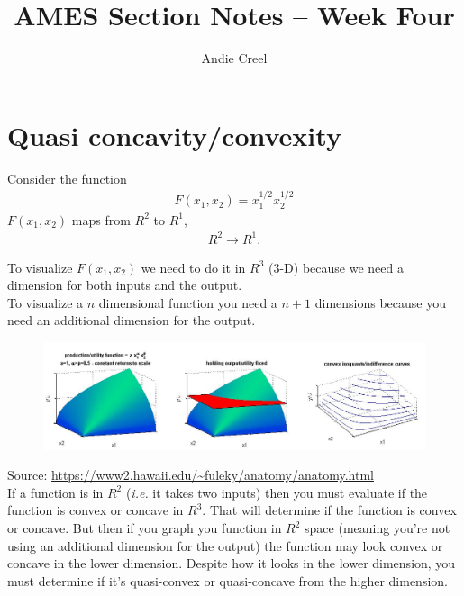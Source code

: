 \documentclass{article}
\title{AMES Section Notes -- Week Four}
\author{Andie Creel}
\begin{document}
\maketitle

\section{Quasi concavity/convexity}

Consider the function 
\begin{align*}
    F(x_1, x_2) = x_1^{1/2} x_2^{1/2}
\end{align*}
$F(x_1, x_2)$ maps from $R^2$ to $R^1$, 
\begin{align*}
    R^2 \to R^1.
\end{align*}

To visualize $F(x_1, x_2)$ we need to do it in $R^3$ (3-D) because we need a dimension for both inputs and the output.\\

To visualize a $n$ dimensional function you need a $n+1$ dimensions because you need an additional dimension for the output.

\begin{figure}[htp]
    \centering
        \includegraphics[width=1\textwidth]{Screen Shot 2023-09-18 at 2.03.06 PM.png}
\end{figure}

Source: \url{https://www2.hawaii.edu/~fuleky/anatomy/anatomy.html}\\



If a function is in $R^2$ (\textit{i.e.} it takes two inputs) then you must evaluate if  the function is convex or concave in $R^3$. That will determine if the function is convex or concave. But then if you graph you function in $R^2$ space (meaning you're not using an additional dimension for the output) the function may look convex or concave in the lower dimension. Despite how it looks in the lower dimension, you must determine if it's quasi-convex or quasi-concave from the higher dimension.  \\
\end{document}

